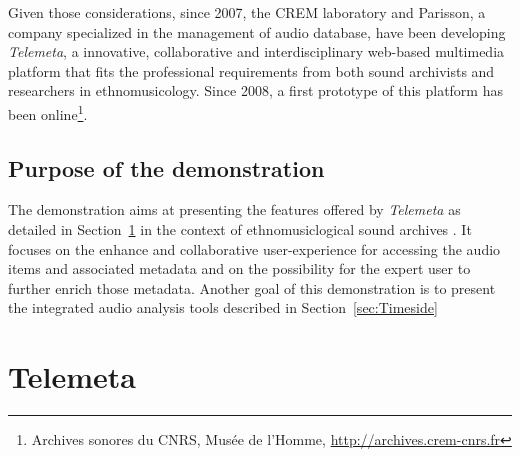 \documentclass[runningheads,a4paper]{llncs}
\begin{document}
Given those considerations, since 2007, the CREM laboratory and Parisson, a company specialized in the management of audio database, have been developing \emph{Telemeta}, a innovative, collaborative and interdisciplinary web-based multimedia platform that fits the professional requirements from both sound archivists and researchers in ethnomusicology. Since 2008, a first prototype of this platform has been online\footnote{Archives sonores du CNRS, Musée de l'Homme, \url{http://archives.crem-cnrs.fr}}.





 
\subsection*{Purpose of the demonstration}
The demonstration aims at presenting the features offered by \emph{Telemeta} as detailed in Section~\ref{sec:Telemeta} in the context of ethnomusiclogical sound archives \cite{telemetaCREM}. It focuses on the enhance and collaborative user-experience for accessing the audio items and associated metadata and on the possibility for the expert user to further enrich those metadata.
Another goal of this demonstration is to present the integrated audio analysis tools described in Section~\ref{sec:Timeside}


\section{Telemeta}\label{sec:Telemeta}
\end{document}
